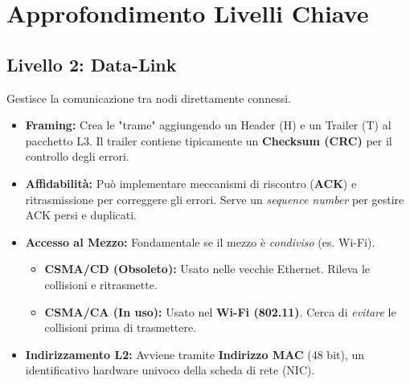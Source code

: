 \documentclass[../main.tex]{subfiles}
\begin{document}
\section{Approfondimento Livelli Chiave}

\subsection{Livello 2: Data-Link}
Gestisce la comunicazione tra nodi direttamente connessi.
\begin{itemize}
    \item \textbf{Framing:} Crea le "trame" aggiungendo un Header (H) e un Trailer (T) al pacchetto L3. Il trailer contiene tipicamente un \textbf{Checksum (CRC)} per il controllo degli errori.
    \item \textbf{Affidabilità:} Può implementare meccanismi di riscontro (\textbf{ACK}) e ritrasmissione per correggere gli errori. Serve un \emph{sequence number} per gestire ACK persi e duplicati.
    \item \textbf{Accesso al Mezzo:} Fondamentale se il mezzo è \emph{condiviso} (es. Wi-Fi).
    \begin{itemize}
        \item \textbf{CSMA/CD (Obsoleto):} Usato nelle vecchie Ethernet. Rileva le collisioni e ritrasmette.
        \item \textbf{CSMA/CA (In uso):} Usato nel \textbf{Wi-Fi (802.11)}. Cerca di \emph{evitare} le collisioni prima di trasmettere.
    \end{itemize}
    \item \textbf{Indirizzamento L2:} Avviene tramite \textbf{Indirizzo MAC} (48 bit), un identificativo hardware univoco della scheda di rete (NIC).
\end{itemize}
\end{document}
